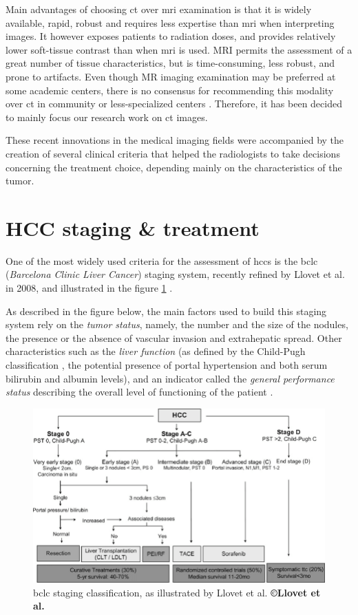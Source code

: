 Main advantages of choosing \ac{ct} over \ac{mri} examination is that it is widely
available, rapid, robust and requires less expertise than \ac{mri} when
interpreting images. It however exposes patients to radiation doses, and
provides relatively lower soft-tissue contrast than when \ac{mri} is used.
MRI permits the assessment of a great number of tissue characteristics,
but is time-consuming, less robust, and prone to artifacts. Even though
MR imaging examination may be preferred at some academic centers, there
is no consensus for recommending this modality over \ac{ct} in community or
less-specialized centers \cite{Choi2014a,Heimbach2018}.
Therefore, it has been decided to mainly focus our research work on \ac{ct}
images.

These recent innovations in the medical imaging fields were accompanied
by the creation of several clinical criteria that helped the
radiologists to take decisions concerning the treatment choice,
depending mainly on the characteristics of the tumor.

\section{HCC staging \& treatment}\label{staging-treatment}

One of the most widely used criteria for the assessment of \ac{hcc}s
is the \ac{bclc} (\emph{Barcelona Clinic Liver Cancer}) staging system, recently refined by Llovet et al. in
2008, and illustrated in the figure \ref{BCLC_llovet} \cite{Llovet2008}.

As described in the figure below, the main factors used to build this
staging system rely on the \emph{tumor status}, namely, the number and
the size of the nodules, the presence or the absence of vascular
invasion and extrahepatic spread. Other characteristics such as the
\emph{liver function} (as defined by the Child-Pugh classification
\cite{Pugh1973} , the potential presence of portal
hypertension and both serum bilirubin and albumin levels), and an
indicator called the \emph{general performance status} describing the
overall level of functioning of the patient \cite{Oken1982}.

\begin{figure}[th!]
\centering
\includegraphics[width=0.8\linewidth]{images/BCLC}
\caption{\ac{bclc} staging classification, as illustrated by Llovet et al. \textbf{©Llovet et al. \cite{Llovet2008}}}
\label{BCLC_llovet}
\end{figure}



